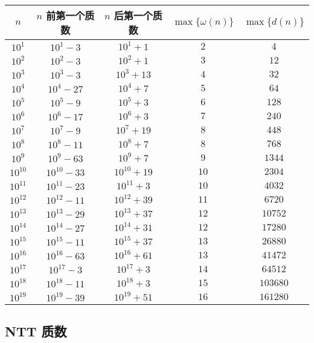 \documentclass[12pt]{ctexart}
\begin{document}
\begin{tabular}{c|c|c|c|c}
	$n$ & $n$ 前第一个质数 & $n$ 后第一个质数 & $\max\{\omega (n)\}$ & $\max\{d(n)\}$\\
	\hline
	$10^{1}$   &   $10^{1}-3$  &   $10^{1}+1$  & $2$  &    $4$    \\
	$10^{2}$   &   $10^{2}-3$  &   $10^{2}+1$  & $3$  &    $12$   \\
	$10^{3}$   &   $10^{3}-3$  &  $10^{3}+13$  & $4$  &    $32$   \\
	$10^{4}$   &  $10^{4}-27$  &   $10^{4}+7$  & $5$  &    $64$   \\
	$10^{5}$   &   $10^{5}-9$  &   $10^{5}+3$  & $6$  &   $128$   \\
	$10^{6}$   &  $10^{6}-17$  &   $10^{6}+3$  & $7$  &   $240$   \\
	$10^{7}$   &   $10^{7}-9$  &  $10^{7}+19$  & $8$  &   $448$   \\
	$10^{8}$   &  $10^{8}-11$  &   $10^{8}+7$  & $8$  &   $768$   \\
	$10^{9}$   &  $10^{9}-63$  &   $10^{9}+7$  & $9$  &   $1344$  \\
	$10^{10}$  &  $10^{10}-33$ &  $10^{10}+19$ & $10$ &   $2304$  \\
	$10^{11}$  &  $10^{11}-23$ &  $10^{11}+3$  & $10$ &   $4032$  \\
	$10^{12}$  &  $10^{12}-11$ &  $10^{12}+39$ & $11$ &   $6720$  \\
	$10^{13}$  &  $10^{13}-29$ &  $10^{13}+37$ & $12$ &  $10752$  \\
	$10^{14}$  &  $10^{14}-27$ &  $10^{14}+31$ & $12$ &  $17280$  \\
	$10^{15}$  &  $10^{15}-11$ &  $10^{15}+37$ & $13$ &  $26880$  \\
	$10^{16}$  &  $10^{16}-63$ &  $10^{16}+61$ & $13$ &  $41472$  \\
	$10^{17}$  &  $10^{17}-3$  &  $10^{17}+3$  & $14$ &  $64512$  \\
	$10^{18}$  &  $10^{18}-11$ &  $10^{18}+3$  & $15$ &  $103680$ \\
	$10^{19}$  &  $10^{19}-39$ &  $10^{19}+51$ & $16$ &  $161280$ \\
\end{tabular}

\subsection{NTT 质数}
\end{document}
